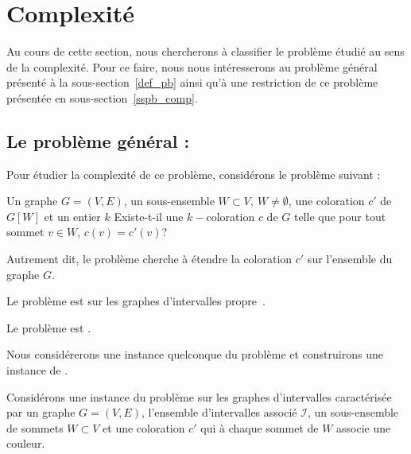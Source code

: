 \documentclass[a4paper,9pt]{report}
\begin{document}
\section{Complexité}
\label{scomplexite}

Au cours de cette section, nous chercherons à classifier le problème étudié au sens de la
complexité. Pour ce faire, nous nous intéresserons au problème général présenté à la
sous-section~\ref{def_pb} ainsi qu'à une restriction de ce problème présentée en
sous-section~\ref{sspb_comp}.

\subsection{Le problème général : \fischedpi}

Pour étudier la complexité de ce problème, considérons le problème suivant :

\dfdec{\precolor}
{Un graphe $G=(V, E)$, un sous-ensemble $W \subset V,\ W \neq \emptyset$, une coloration $c'$ de $G[W]$ et un
entier $k$}
{Existe-t-il une $k-$coloration $c$ de $G$ telle que pour tout sommet $v \in W$, $c(v) =
c'(v)$?}

Autrement dit, le problème \precolor cherche à étendre la coloration $c'$ sur l'ensemble du graphe
$G$.

\begin{nthrm}
    Le problème \precolor est \npc sur les graphes d'intervalles
    propre~\cite{marx2006precoloring}.
\end{nthrm}

\begin{nthrm}
    Le problème \fischedpi est \npc.
\end{nthrm}

Nous considérerons une instance quelconque du problème \precolor et construirons une instance de
\fischedpi.

Considérons une instance du problème \precolor sur les graphes d'intervalles caractérisée
par un graphe $G = (V,E)$, l'ensemble d'intervalles associé $\mathcal{I}$, un
sous-ensemble de sommets $W \subset V$ et une coloration $c'$ qui à chaque sommet de $W$ associe
une couleur. 
\end{document}

